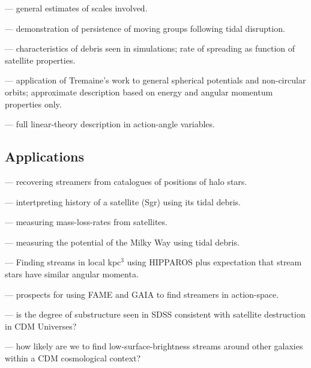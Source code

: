 \cite{tremaine93} --- general estimates of scales involved.

\cite{jsh95} --- demonstration of persistence of moving
groups following tidal disruption.

\cite{jhb96} --- characteristics of debris seen in
simulations; rate of spreading as function of satellite
properties. 

\cite{johnston98a,johnston01c} --- application of Tremaine's work to
general spherical potentials and non-circular orbits; approximate
description based on energy and angular momentum properties 
only.

\cite{helmi99a} --- full linear-theory description in action-angle
variables.

\subsection{Applications}

\cite{jhb96} --- recovering streamers from catalogues of positions
of halo stars.

\cite{johnston99} --- intertpreting history of a satellite (Sgr)
using its tidal debris.

\cite{jsh99} --- measuring mass-loss-rates from satellites.

\cite{jzsh99} --- measuring the potential of the Milky Way using
tidal debris.

\cite{helmi99b} --- Finding streams in local kpc$^3$ using
HIPPAROS plus expectation that stream stars have similar
angular momenta.

\cite{helmi00} --- prospects for using FAME and GAIA to find 
streamers in action-space.

\cite{bullock01} --- is the degree of substructure seen in SDSS 
consistent with satellite destruction in CDM Universes?

\cite{johnston01c} --- how likely are we to find low-surface-brightness
streams around other galaxies within a CDM cosmological context?

